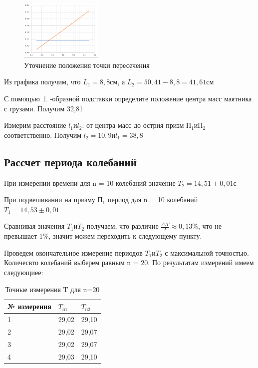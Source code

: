 \documentclass[a4paper]{article}
\begin{document}
\begin{figure}[h]
    \centering
    \includegraphics[width=0.35\textwidth]{pick4.PNG} 
    \caption{Уточнение положения точки пересечения}
    \end{figure}

Из графика получим, что $L_{1} = 8,8 \text{см}$, а $L_{2} = 50,41-8,8=41,61 \text{см}$\par
С помощью $\bot$ -образной подставки определите положение центра масс 
маятника с грузами. Получим 32,81\par
Измерим расстояние $l_{1} \text{и} l_{2}$: от центра масс до
острия призм  $\text{П}_{1} \text{и} \text{П}_{2} $ соответственно. Получим $l_{2} = 10,9 \text{и} l_{1} = 38,8$

\subsection{Рассчет периода колебаний }
При измерении времени для n = 10 колебаний значение $T_{2} = 14,51\pm 0,01\text{с}$\par
При подвешивании на призму $\text{П}_{1}$ период для n = 10 колебаний $T_{1} = 14,53\pm 0,01$ \par
Сравнивая значения $T_{1}\text{и} T_{2} $ получаем, что различие $\frac{\bigtriangleup T}{T}\approx 0,13\%  $, что не превышает 1\%, значит можем переходить к следующему пункту.\par
Проведем окончательное измерение периодов  $T_{1}\text{и} T_{2} $ с максимальной точностью. Количесвто колебаний выберем равным n = 20. По результатам измерений имеем следующиее:

\begin{table}[!h]
    \begin{center}
    \begin{tabular}{|l|l|l|}
    \hline
    № измерения  & $T_{\text{п1}}$  &$T_{\text{п2}}$   \\ \hline
    1  & 29,02 & 29,10   \\ \hline
    2 & 29,02 & 29,07  \\ \hline
    3 & 29,02 & 29,07  \\ \hline
    4 & 29,03 & 29,10  \\ \hline
    \end{tabular}
    \caption{Точные измерения T для n=20}
    \end{center}
    \end{table}
\end{document}

